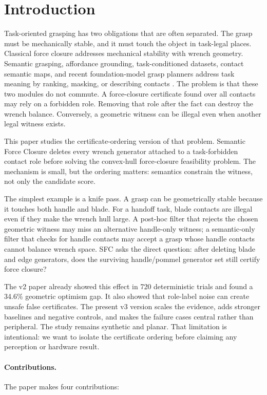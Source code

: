 \documentclass{article}
\begin{document}
\section{Introduction}

Task-oriented grasping has two obligations that are often separated. The grasp must be mechanically stable, and it must touch the object in task-legal places. Classical force closure addresses mechanical stability with wrench geometry. Semantic grasping, affordance grounding, task-conditioned datasets, contact semantic maps, and recent foundation-model grasp planners address task meaning by ranking, masking, or describing contacts \citep{lit001,lit003,lit004,lit011,lit018,lit055}. The problem is that these two modules do not commute. A force-closure certificate found over all contacts may rely on a forbidden role. Removing that role after the fact can destroy the wrench balance. Conversely, a geometric witness can be illegal even when another legal witness exists.

This paper studies the certificate-ordering version of that problem. Semantic Force Closure deletes every wrench generator attached to a task-forbidden contact role before solving the convex-hull force-closure feasibility problem. The mechanism is small, but the ordering matters: semantics constrain the witness, not only the candidate score.

The simplest example is a knife pass. A grasp can be geometrically stable because it touches both handle and blade. For a handoff task, blade contacts are illegal even if they make the wrench hull large. A post-hoc filter that rejects the chosen geometric witness may miss an alternative handle-only witness; a semantic-only filter that checks for handle contacts may accept a grasp whose handle contacts cannot balance wrench space. SFC asks the direct question: after deleting blade and edge generators, does the surviving handle/pommel generator set still certify force closure?

The v2 paper already showed this effect in 720 deterministic trials and found a 34.6\% geometric optimism gap. It also showed that role-label noise can create unsafe false certificates. The present v3 version scales the evidence, adds stronger baselines and negative controls, and makes the failure cases central rather than peripheral. The study remains synthetic and planar. That limitation is intentional: we want to isolate the certificate ordering before claiming any perception or hardware result.

\paragraph{Contributions.}
The paper makes four contributions:
\end{document}
